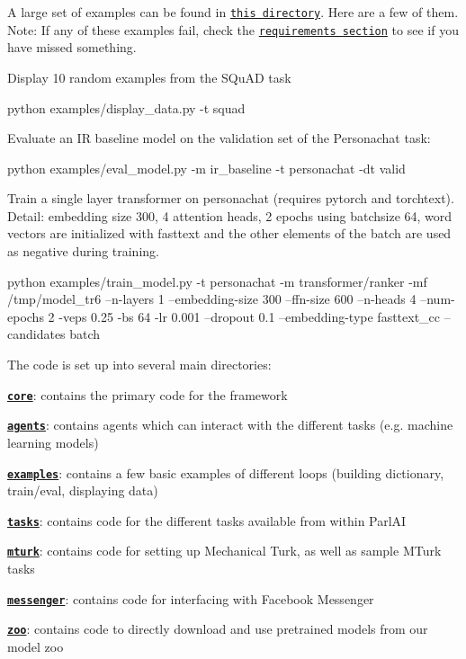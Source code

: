 A large set of examples can be found in \href{./examples}{\tt this directory}. Here are a few of them. Note\+: If any of these examples fail, check the \href{#requirements}{\tt requirements section} to see if you have missed something.

Display 10 random examples from the S\+Qu\+AD task 
\begin{DoxyCode}
python examples/display\_data.py -t squad
\end{DoxyCode}


Evaluate an IR baseline model on the validation set of the Personachat task\+: 
\begin{DoxyCode}
python examples/eval\_model.py -m ir\_baseline -t personachat -dt valid
\end{DoxyCode}


Train a single layer transformer on personachat (requires pytorch and torchtext). Detail\+: embedding size 300, 4 attention heads, 2 epochs using batchsize 64, word vectors are initialized with fasttext and the other elements of the batch are used as negative during training. 
\begin{DoxyCode}
python examples/train\_model.py -t personachat -m transformer/ranker -mf /tmp/model\_tr6 --n-layers 1
       --embedding-size 300 --ffn-size 600 --n-heads 4 --num-epochs 2 -veps 0.25 -bs 64 -lr 0.001 --dropout 0.1
       --embedding-type fasttext\_cc --candidates batch
\end{DoxyCode}


The code is set up into several main directories\+:


\begin{DoxyItemize}
\item \href{./parlai/core}{\tt {\bfseries core}}\+: contains the primary code for the framework
\item \href{./parlai/agents}{\tt {\bfseries agents}}\+: contains agents which can interact with the different tasks (e.\+g. machine learning models)
\item \href{./parlai/examples}{\tt {\bfseries examples}}\+: contains a few basic examples of different loops (building dictionary, train/eval, displaying data)
\item \href{./parlai/tasks}{\tt {\bfseries tasks}}\+: contains code for the different tasks available from within Parl\+AI
\item \href{./parlai/mturk}{\tt {\bfseries mturk}}\+: contains code for setting up Mechanical Turk, as well as sample M\+Turk tasks
\item \href{./parlai/chat_service/services/messenger}{\tt {\bfseries messenger}}\+: contains code for interfacing with Facebook Messenger
\item \href{./parlai/zoo}{\tt {\bfseries zoo}}\+: contains code to directly download and use pretrained models from our model zoo
\end{DoxyItemize}

